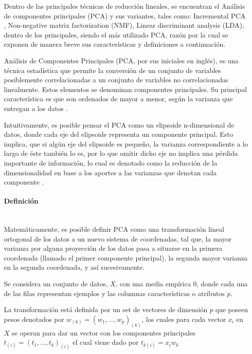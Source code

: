Dentro de las principales técnicas de reducción lineales, se encuentran el Análisis de componentes principales (PCA) y sus variantes, tales como: Incremental PCA \cite{jolliffe2011principal}, Non-negative matrix factorization (NMF), Linear discriminant analysis (LDA), dentro de los principales, siendo el más utilizado PCA, razón por la cual se exponen de manera breve sus características y definiciones a continuación. 

Análisis de Componentes Principales (PCA, por sus iniciales en inglés), es una técnica estadística que permite la conversión de un conjunto de variables posiblemente correlacionadas a un conjunto de variables no correlacionadas linealmente. Estos elementos se denominan componentes principales. Su principal característica es que son ordenados de mayor a menor, según la varianza que entregan a los datos \cite{jolliffe2011principal}.

Intuitivamente, es posible pensar el PCA como un elipsoide n-dimensional de datos, donde cada eje del elipsoide representa un componente principal. Esto implica, que si algún eje del elipsoide es pequeño, la varianza correspondiente a lo largo de éste también lo es, por lo que omitir dicho eje no implica una pérdida importante de información, lo cual es denotado como la reducción de la dimensionalidad en base a los aportes a las varianzas que denotan cada componente \cite{wold1987principal}.

\paragraph{Definición\\\\}

Matemáticamente, es posible definir PCA como una transformación lineal ortogonal de los datos a un nuevo sistema de coordenadas, tal que, la mayor varianza por alguna proyección de los datos pasa a situarse en la primera coordenada (llamado el primer componente principal), la segunda mayor varianza en la segunda coordenada, y así sucesivamente.

Se considera un conjunto de datos, $X$, con una media empírica 0, donde cada una de las filas  representan ejemplos y las columnas características o atributos $p$.

La transformación está definida por un set de vectores de dimensión $p$ que poseen pesos denotados por $ w_{(k)} = (w_{1},...,w_{p})_{(k)}$, los cuales para cada vector $x_{i}$ en $X$ se operan para dar un vector con los componentes principales $ t_{(i)} = (t_{1},...,t_{k})_{(i)}$ el cual viene dado por $ t_{k(i)} = x_{i}  w_{k}$

